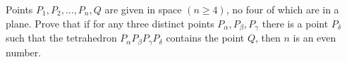Points $P_1,P_2,\ldots,P_n,Q$ are given in space $(n\ge4)$, no four of which are in a plane. Prove that if for any three distinct points $P_\alpha,P_\beta,P_\gamma$ there is a point $P_\delta$ such that the tetrahedron $P_\alpha P_\beta P_\gamma P_\delta$ contains the point $Q$, then $n$ is an even number.